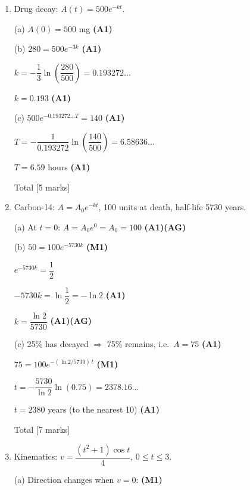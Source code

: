 \documentclass[12pt, twoside]{article}
\begin{document}
\begin{enumerate}[itemsep=0.4cm]
$\dfrac{2\pi}{b} = 20$ \hfill \textbf{(M1)}

$b = \dfrac{\pi}{10} \;(= 0.314\ldots)$ \hfill \textbf{(A1)}

\hfill Total [5 marks]

\bigskip

\item Drug decay: $A(t) = 500e^{-kt}$.

(a) $A(0) = 500$ mg \hfill \textbf{(A1)}

\medskip
(b) $280 = 500e^{-3k}$ \hfill \textbf{(A1)}

$k = -\dfrac{1}{3}\ln\!\left(\dfrac{280}{500}\right) = 0.193272\ldots$

$k = 0.193$ \hfill \textbf{(A1)}

\medskip
(c) $500e^{-0.193272\ldots T} = 140$ \hfill \textbf{(A1)}

$T = -\dfrac{1}{0.193272}\ln\!\left(\dfrac{140}{500}\right) = 6.58636\ldots$

$T = 6.59$ hours \hfill \textbf{(A1)}

\hfill Total [5 marks]

\bigskip

\item Carbon-14: $A = A_0 e^{-kt}$, 100 units at death, half-life 5730 years.

(a) At $t = 0$: $A = A_0 e^{0} = A_0 = 100$ \hfill \textbf{(A1)(AG)}

\medskip
(b) $50 = 100e^{-5730k}$ \hfill \textbf{(M1)}

$e^{-5730k} = \dfrac{1}{2}$

$-5730k = \ln\dfrac{1}{2} = -\ln 2$ \hfill \textbf{(A1)}

$k = \dfrac{\ln 2}{5730}$ \hfill \textbf{(A1)(AG)}

\medskip
(c) 25\% has decayed $\Rightarrow$ 75\% remains, i.e.\ $A = 75$ \hfill \textbf{(A1)}

$75 = 100e^{-(\ln 2/5730)\,t}$ \hfill \textbf{(M1)}

$t = -\dfrac{5730}{\ln 2}\ln(0.75) = 2378.16\ldots$

$t = 2380$ years (to the nearest 10) \hfill \textbf{(A1)}

\hfill Total [7 marks]

\bigskip

\item Kinematics: $v = \dfrac{(t^2+1)\cos t}{4}$, \; $0 \leq t \leq 3$.

(a) Direction changes when $v = 0$: \hfill \textbf{(M1)}


\end{enumerate}
\end{document}
